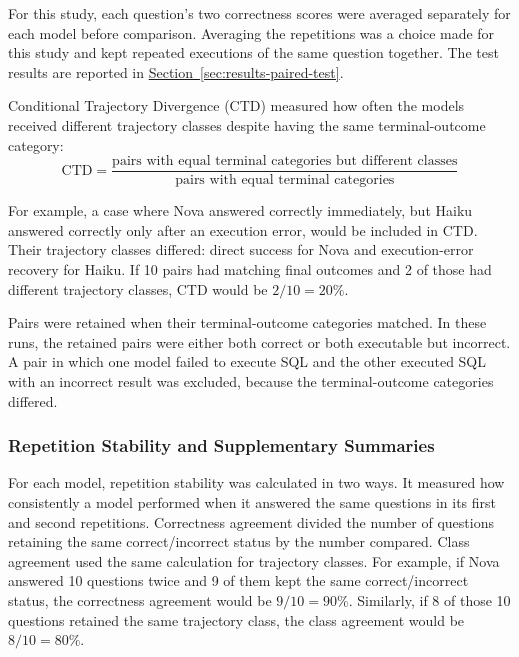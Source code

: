 For this study, each question's two correctness scores were averaged separately
for each model before comparison. 
Averaging the repetitions was a choice made for this study and kept
repeated executions of the same question together.
The test results are reported in
\hyperref[sec:results-paired-test]{Section~\ref*{sec:results-paired-test}}.

\begin{samepage}
Conditional Trajectory Divergence (CTD) measured how often the models received
different trajectory classes despite having the same terminal-outcome category:
\begin{equation}
\label{eq:ctd}
\mathrm{CTD} =
\frac{\text{pairs with equal terminal categories but different classes}}
     {\text{pairs with equal terminal categories}}
\end{equation}
\end{samepage}

For example, a case where Nova answered correctly immediately, 
but Haiku answered correctly only after an execution error, would be included in CTD. 
Their trajectory classes differed:
direct success for Nova and execution-error recovery for Haiku. 
If 10 pairs
had matching final outcomes and 2 of those had different trajectory classes,
CTD would be $2/10 = 20\%$.

Pairs were retained when their terminal-outcome categories matched.
In these runs, the retained pairs were either both correct or both executable
but incorrect. A pair in which one model failed to execute SQL
and the other executed SQL with an incorrect result was excluded, because
the terminal-outcome categories differed.

\subsubsection{Repetition Stability and Supplementary Summaries}

For each model, repetition stability was calculated in two ways.
It measured how consistently a model performed when it answered the same questions in its first and second repetitions.
Correctness agreement divided the number of questions retaining the same correct/incorrect
status by the number compared. 
Class agreement used the same calculation for trajectory classes. 
For example, if Nova answered 10 questions twice and 9 of them kept the same correct/incorrect status, the correctness agreement would be $9/10 = 90\%$.
Similarly, if 8 of those 10 questions retained the same trajectory class, the class agreement would be $8/10 = 80\%$.

